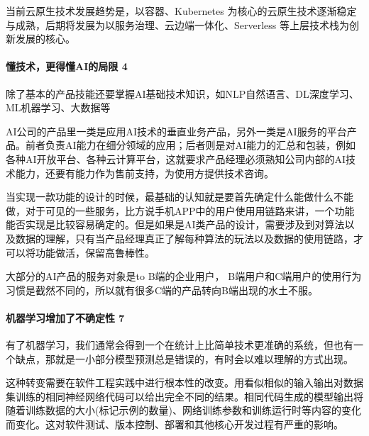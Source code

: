 \documentclass[letterpaper,11pt,english]{sphinxmanual}
\begin{document}
当前云原生技术发展趋势是，以容器、Kubernetes
为核心的云原生技术逐渐稳定与成熟，后期将发展为以服务治理、云边端一体化、Serverless
等上层技术栈为创新发展的核心。


\paragraph{懂技术，更得懂AI的局限 4\sphinxfootnotemark[376]}
\label{\detokenize{chapter_idea/understand_tech:ai-4}}%
\begin{footnotetext}[376]\sphinxAtStartFootnote
{}
%
\end{footnotetext}\ignorespaces 
除了基本的产品技能还要掌握AI基础技术知识，如NLP自然语言、DL深度学习、ML机器学习、大数据等

AI公司的产品里一类是应用AI技术的垂直业务产品，另外一类是AI服务的平台产品。前者负责AI能力在细分领域的应用；后者则是对AI能力的汇总和包装，例如各种AI开放平台、各种云计算平台，这就要求产品经理必须熟知公司内部的AI技术能力，还要有能力作为售前支持，为使用方提供技术咨询。

当实现一款功能的设计的时候，最基础的认知就是要首先确定什么能做什么不能做，对于可见的一些服务，比方说手机APP中的用户使用用链路来讲，一个功能能否实现是比较容易确定的。但是如果是AI类产品的设计，需要涉及到对算法以及数据的理解，只有当产品经理真正了解每种算法的玩法以及数据的使用链路，才可以将功能做活，保留高鲁棒性。

大部分的AI产品的服务对象是to B端的企业用户，
B端用户和C端用户的使用行为习惯是截然不同的，所以就有很多C端的产品转向B端出现的水土不服。


\paragraph{机器学习增加了不确定性 7\sphinxfootnotemark[377]}
\label{\detokenize{chapter_idea/understand_tech:id32}}%
\begin{footnotetext}[377]\sphinxAtStartFootnote
{}
%
\end{footnotetext}\ignorespaces 
有了机器学习，我们通常会得到一个在统计上比简单技术更准确的系统，但也有一个缺点，那就是一小部分模型预测总是错误的，有时会以难以理解的方式出现。

这种转变需要在软件工程实践中进行根本性的改变。用看似相似的输入输出对数据集训练的相同神经网络代码可以给出完全不同的结果。相同代码生成的模型输出将随着训练数据的大小(标记示例的数量)、网络训练参数和训练运行时等内容的变化而变化。这对软件测试、版本控制、部署和其他核心开发过程有严重的影响。
\end{document}
